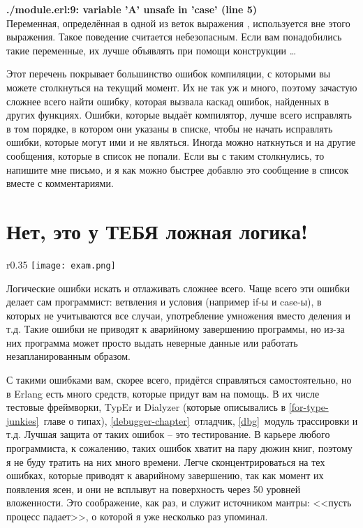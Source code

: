 \blankline
\begin{minipage}{\textwidth}
    \textbf{./module.erl:9: variable 'A' unsafe in 'case' (line 5)}\\
    Переменная, определённая в одной из веток выражения , используется вне этого выражения.
    Такое поведение считается небезопасным.
    Если вам понадобились такие переменные, их лучше объявлять при помощи конструкции \ldots
\end{minipage}

Этот перечень покрывает большинство ошибок компиляции, с которыми вы можете столкнуться на текущий момент. Их не так уж и много, поэтому зачастую сложнее всего найти ошибку, которая вызвала каскад ошибок, найденных в других функциях.
Ошибки, которые выдаёт компилятор, лучше всего исправлять в том порядке, в котором они указаны в списке, чтобы не начать исправлять ошибки, которые могут ими и не являться.
Иногда можно наткнуться и на другие сообщения, которые в список не попали.
Если вы с таким столкнулись, то напишите мне письмо, и я как можно быстрее добавлю это сообщение в список вместе с комментариями.
\section{Нет, это у ТЕБЯ ложная логика!}
\label{no-your-logic-is-wrong}
\begin{wrapfigure}{r}{0.35\linewidth}
    \texttt{[image: exam.png]}
\end{wrapfigure}
Логические ошибки искать и отлаживать сложнее всего. Чаще всего эти ошибки делает сам программист: ветвления и условия (например if\--ы и case\--ы), в которых не учитываются все случаи, употребление умножения вместо деления и т.д.
Такие ошибки не приводят к аварийному завершению программы, но из\--за них программа может просто выдать неверные данные или работать незапланированным образом.

С такими ошибками вам, скорее всего, придётся справляться самостоятельно, но в Erlang есть много средств, которые придут вам на помощь.
В их числе тестовые фреймворки, TypEr и Dialyzer (которые описывались в \ref{for-type-junkies}~главе о типах), \ref{debugger-chapter}~отладчик, \ref{dbg}~модуль трассировки и т.д.
Лучшая защита от таких ошибок \--- это тестирование.
В карьере любого программиста, к сожалению, таких ошибок хватит на пару дюжин книг, поэтому я не буду тратить на них много времени.
Легче сконцентрироваться на тех ошибках, которые приводят к аварийному завершению, так как момент их появления ясен, и они не всплывут на поверхность через 50 уровней вложенности.
Это соображение, как раз, и служит источником мантры: <<пусть процесс падает>>, о которой я уже несколько раз упоминал.

